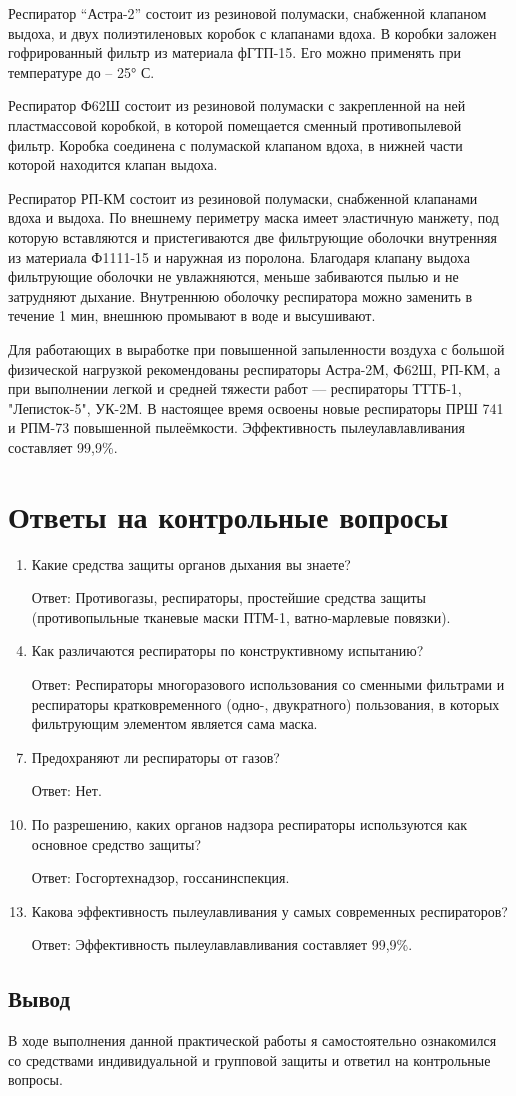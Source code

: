 \documentclass[a5paper, 12dd, twoside]{article}
\begin{document}
Респиратор ``Астра-2'' состоит из резиновой полумаски, снабженной клапаном выдоха, и двух полиэтиленовых коробок с клапанами вдоха. В коробки заложен гофрированный фильтр из материала фГТП-15. Его можно применять при температуре до -- 25° С.

Респиратор Ф62Ш состоит из резиновой полумаски с закрепленной на ней пластмассовой коробкой, в которой помещается сменный противопылевой фильтр. Коробка соединена с полумаской клапаном вдоха, в нижней части которой находится клапан выдоха.

Респиратор РП-КМ состоит из резиновой полумаски, снабженной клапанами вдоха и выдоха. По внешнему периметру маска имеет эластичную манжету, под которую вставляются и пристегиваются две фильтрующие оболочки внутренняя из материала Ф1111-15 и наружная из поролона. Благодаря клапану выдоха фильтрующие оболочки не увлажняются, меньше забиваются пылью и не затрудняют дыхание. Внутреннюю оболочку респиратора можно заменить в течение 1 мин, внешнюю промывают в воде и высушивают.

Для работающих в выработке при повышенной запыленности воздуха с большой физической нагрузкой рекомендованы респираторы Астра-2М, Ф62Ш, РП-КМ, а при выполнении легкой и средней тяжести работ — респираторы ТТТБ-1, "Леписток-5", УК-2М. В настоящее время освоены новые респираторы ПРШ 741 и РПМ-73 повышенной пылеёмкости. Эффективность пылеулавлавливания составляет 99,9\%.


\section{Ответы на контрольные вопросы}
\begin{enumerate}
    \item Какие средства защиты органов дыхания вы знаете?
    \item [Ответ:] Противогазы, респираторы, простейшие средства защиты (противопыльные тканевые маски ПТМ-1, ватно-марлевые повязки).
    \item []
    \item Как различаются респираторы по конструктивному испытанию?
    \item [Ответ:] Респираторы многоразового использования со сменными фильтрами и респираторы кратковременного (одно-, двукратного) пользования, в которых фильтрующим элементом является сама маска.
    \item []
    \item Предохраняют ли респираторы от газов?
    \item [Ответ:] Нет.
    \item []
    \item По разрешению, каких органов надзора респираторы используются как основное средство защиты?
    \item [Ответ:] Госгортехнадзор, госсанинспекция.
    \item []
    \item Какова эффективность пылеулавливания у самых современных респираторов?
    \item [Ответ:] Эффективность пылеулавлавливания составляет 99,9\%.
\end{enumerate}


\subsection*{Вывод}
В ходе выполнения данной практической работы я самостоятельно ознакомился со средствами индивидуальной и групповой защиты и ответил на контрольные вопросы.
\end{document}
